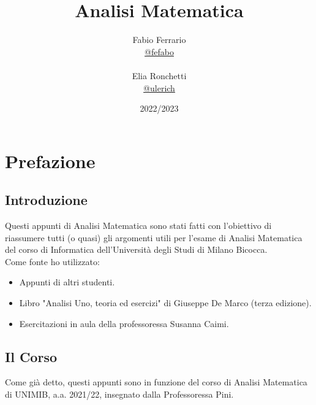 \documentclass[12pt, a4paper, openany]{book}
\begin{document}
\title{Analisi Matematica}
\author{
	Fabio Ferrario\\
	\small{\href{https://t.me/fefabo}{@fefabo}}
	\\\\Elia Ronchetti\\
	\small{\href{https://t.me/ulerich}{@ulerich}}
}
\date{2022/2023}
\maketitle

\tableofcontents

\chapter*{Prefazione}
\section{Introduzione}
Questi appunti di Analisi Matematica sono stati fatti con l'obiettivo di riassumere tutti (o quasi) gli argomenti utili per l'esame di Analisi Matematica del corso di Informatica dell'Università degli Studi di Milano Bicocca.
\\Come fonte ho utilizzato:
\begin{itemize}
	\item Appunti di altri studenti.
	\item Libro "Analisi Uno, teoria ed esercizi" di Giuseppe De Marco (terza edizione).
	\item Esercitazioni in aula della professoressa Susanna Caimi.
\end{itemize}
\section*{Il Corso}
Come già detto, questi appunti sono in funzione del corso di Analisi Matematica di UNIMIB, a.a. 2021/22, insegnato dalla Professoressa Pini.
\end{document}
